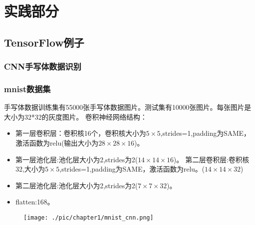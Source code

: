\chapter{实践部分}
\section{TensorFlow例子}
\subsection{CNN手写体数据识别}
\subsection{mnist数据集}
手写体数据训练集有55000张手写体数据图片。测试集有10000张图片。每张图片是大小为32*32的灰度图片。
卷积神经网络结构：
\begin{itemize}
	\item 第一层卷积层：卷积核16个，卷积核大小为$5\times5$,strides=1,padding为SAME，激活函数为relu(输出大小为$28\times28\times16$)。
	\item 第一层池化层:池化层大小为2,strides为2($14\times14\times16$)。
第二层卷积层:卷积核32,大小为$5\times5$,strides=1,padding为SAME，激活函数为relu。($14\times14\times32$)
	\item 第二层池化层:池化层大小为2,strides为2($7\times7\times32$)。
	\item flatten:168。
\end{itemize}
\begin{figure}[H]
	\texttt{[image: ./pic/chapter1/mnist\_cnn.png]}
\end{figure}
